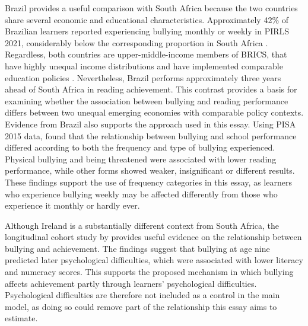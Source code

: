 Brazil provides a useful comparison with South Africa because the two countries share several economic and educational characteristics. Approximately 42\% of Brazilian learners reported experiencing bullying monthly or weekly in PIRLS 2021, considerably below the corresponding proportion in South Africa \citep{mullis2023pirls}. Regardless, both countries are upper-middle-income members of BRICS, that have highly unequal income distributions and have implemented comparable education policies \citep{de2023comparative,spaull2023pirls}. Nevertheless, Brazil performs approximately three years ahead of South Africa in reading achievement. This contrast provides a basis for examining whether the association between bullying and reading performance differs between two unequal emerging economies with comparable policy contexts. Evidence from Brazil also supports the approach used in this essay. Using PISA 2015 data, \citet{sbrogliorizzotto2021bullying} found that the relationship between bullying and school performance differed according to both the frequency and type of bullying experienced. Physical bullying and being threatened were associated with lower reading performance, while other forms showed weaker, insignificant or different results. These findings support the use of frequency categories in this essay, as learners who experience bullying weekly may be affected differently from those who experience it monthly or hardly ever.

Although Ireland is a substantially different context from South Africa, the longitudinal cohort study by \citet{murphy2022educational} provides useful evidence on the relationship between bullying and achievement. The findings suggest that bullying at age nine predicted later psychological difficulties, which were associated with lower literacy and numeracy scores. This supports the proposed mechanism in which bullying affects achievement partly through learners' psychological difficulties. Psychological difficulties are therefore not included as a control in the main model, as doing so could remove part of the relationship this essay aims to estimate.
